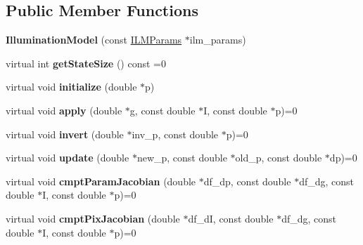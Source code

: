 \subsection*{Public Member Functions}
\begin{DoxyCompactItemize}
\item 
\hypertarget{classIlluminationModel_a15002b87b3e5d8028ec2a41e4b449858}{{\bfseries Illumination\-Model} (const \hyperlink{structILMParams}{I\-L\-M\-Params} $\ast$ilm\-\_\-params)}\label{classIlluminationModel_a15002b87b3e5d8028ec2a41e4b449858}

\item 
\hypertarget{classIlluminationModel_aa0cd6e5f5ae8a3ec40a236850ba9f4c6}{virtual int {\bfseries get\-State\-Size} () const =0}\label{classIlluminationModel_aa0cd6e5f5ae8a3ec40a236850ba9f4c6}

\item 
\hypertarget{classIlluminationModel_a7659625f49e862d79e805d52b6f25000}{virtual void {\bfseries initialize} (double $\ast$p)}\label{classIlluminationModel_a7659625f49e862d79e805d52b6f25000}

\item 
\hypertarget{classIlluminationModel_ae059487d9714a6318276354d814a9f7e}{virtual void {\bfseries apply} (double $\ast$g, const double $\ast$I, const double $\ast$p)=0}\label{classIlluminationModel_ae059487d9714a6318276354d814a9f7e}

\item 
\hypertarget{classIlluminationModel_a3e55966b7f58f87be86b687664f6b692}{virtual void {\bfseries invert} (double $\ast$inv\-\_\-p, const double $\ast$p)=0}\label{classIlluminationModel_a3e55966b7f58f87be86b687664f6b692}

\item 
\hypertarget{classIlluminationModel_a6552e22adee7a0ce77c9d8c5855719ea}{virtual void {\bfseries update} (double $\ast$new\-\_\-p, const double $\ast$old\-\_\-p, const double $\ast$dp)=0}\label{classIlluminationModel_a6552e22adee7a0ce77c9d8c5855719ea}

\item 
\hypertarget{classIlluminationModel_a451142f32d7de0618032004bb601b75b}{virtual void {\bfseries cmpt\-Param\-Jacobian} (double $\ast$df\-\_\-dp, const double $\ast$df\-\_\-dg, const double $\ast$I, const double $\ast$p)=0}\label{classIlluminationModel_a451142f32d7de0618032004bb601b75b}

\item 
\hypertarget{classIlluminationModel_ae35b55b3cde313c4366a9d97423335ad}{virtual void {\bfseries cmpt\-Pix\-Jacobian} (double $\ast$df\-\_\-d\-I, const double $\ast$df\-\_\-dg, const double $\ast$I, const double $\ast$p)=0}\label{classIlluminationModel_ae35b55b3cde313c4366a9d97423335ad}


\end{DoxyCompactItemize}
